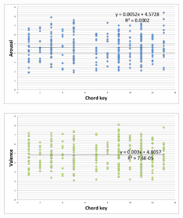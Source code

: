 \begin{figure}
         \centering
        \begin{subfigure}[b]{0.48\textwidth}
                \includegraphics[width=\textwidth]{Figures/chordkey-arousal}
			   \vspace{20pt}
        \end{subfigure}
        \begin{subfigure}[b]{0.48\textwidth}
                \includegraphics[width=\textwidth]{Figures/chordkey-valence}
                  \vspace{20pt}
        \end{subfigure}
        

\end{figure}
